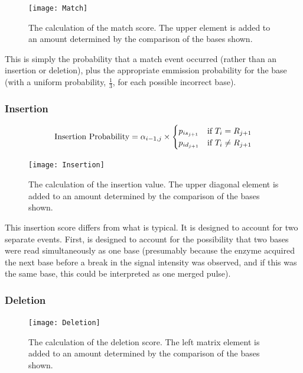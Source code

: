 \documentclass[fleqn,10pt]{SelfArx} %
\begin{document}
\begin{figure}[ht] %
	\texttt{[image: Match]}
		\caption{The calculation of the match score.  The upper element is added to an amount determined by the comparison of the bases shown.}
\end{figure}

This is simply the probability that a match event occurred (rather than an insertion or deletion), plus the appropriate emmission probability for the base (with a uniform probability,  $\frac{1}{3}$, for each possible incorrect base).

\subsubsection{\textbf{Insertion}}


\begin{dmath}
\text{Insertion Probability} = \\
	\alpha_{i-1,j}  \times 
	\begin{cases}
		p_{is_{j+1}}  & \text{if }  T_{i} = R_{j+1} \\
		p_{id_{j+1}} & \text{if }  T_{i}  \neq R_{j+1} 
	\end{cases}
\end{dmath}

\begin{figure}[ht] %
	\texttt{[image: Insertion]}
		\caption{The calculation of the insertion value.  The upper diagonal element is added to an amount determined by the comparison of the bases shown.}
\end{figure}


This insertion score differs from what is typical.  It is designed to account for two separate events.  First, is designed to account for the possibility that two bases were read simultaneously as one base (presumably because the enzyme acquired the next base before a break in the signal intensity was observed, and if this was the same base, this could be interpreted as one merged pulse).
 
\subsubsection{\textbf{Deletion}}

\begin{figure}[ht] %
	\texttt{[image: Deletion]}
		\caption{The calculation of the deletion score.  The left matrix element is added to an amount determined by the comparison of the bases shown.}				
\end{figure}
\end{document}
